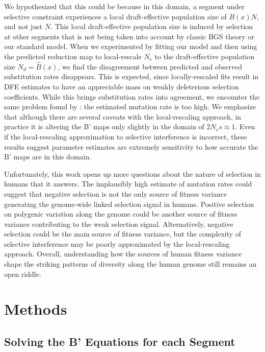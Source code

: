 \documentclass[11pt]{article}
\begin{document}
We hypothesized that this could be because in this domain, a segment under
selective constraint experiences a local draft-effective population size of
$B(x)N$, and not just $N$. This local draft-effective population size is
induced by selection at other segments that is not being taken into account by
classic BGS theory or our standard model. When we experimented by fitting our
model and then using the predicted reduction map to local-rescale $N_e$ to the
draft-effective population size $N_d = \widehat{B}(x)$, we find the
disagreement between predicted and observed substitution rates disappears. This
is expected, since locally-rescaled fits result in DFE estimates to have an
appreciable mass on weakly deleterious selection coefficients. While this
brings substitution rates into agreement, we encounter the same problem found
by \textcite{McVicker2009-ax}: the estimated mutation rate is too high. We
emphasize that although there are several caveats with the local-rescaling
approach, in practice it is altering the B' maps only slightly in the domain of
$2N_e s \approx 1$. Even if the local-rescaling approximation to selective
interference is incorrect, these results suggest parameter estimates are
extremely sensitivity to how accurate the B' maps are in this domain.

Unfortunately, this work opens up more questions about the nature of selection
in humans that it answers. The implausibly high estimate of mutation rates
could suggest that negative selection is not the only source of fitness
variance generating the genome-wide linked selection signal in humans. Positive
selection on polygenic variation along the genome could be another source of
fitness variance contributing to the weak selection signal. Alternatively,
negative selection could be the main source of fitness variance, but the
complexity of selective interference may be poorly approximated by the
local-rescaling approach. Overall, understanding how the sources of human
fitness variance shape the striking patterns of diversity along the human
genome still remains an open riddle.

\section*{Methods}

\subsection*{Solving the B' Equations for each Segment}
\label{sec:methods-bprime-eqns}
\end{document}
